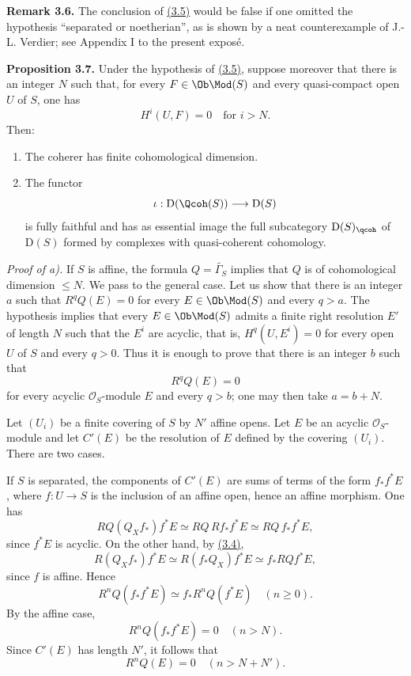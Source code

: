 \textbf{Remark 3.6.} The conclusion of \hyperlink{sga6.e02.prop.3-5}{(3.5)} would be false if one omitted the hypothesis ``separated or noetherian'', as is shown by a neat counterexample of J.-L. Verdier; see Appendix I to the present exposé.

\textbf{Proposition 3.7.} Under the hypothesis of \hyperlink{sga6.e02.prop.3-5}{(3.5)}, suppose moreover that there is an integer $N$ such that, for every $F\in\Ob\Mod(S)$ and every quasi-compact open $U$ of $S$, one has
\[
 H^i(U,F)=0\quad\text{for }i>N.
\]
Then:
\begin{enumerate}[label=\alph*)]
\item The coherer has finite cohomological dimension.
\item The functor
\[
 \iota:\mathrm D(\Qcoh(S))\longrightarrow \mathrm D(S)
\]
is fully faithful and has as essential image the full subcategory $\mathrm D(S)_{\qcoh}$ of $\mathrm D(S)$ formed by complexes with quasi-coherent cohomology.
\end{enumerate}

\emph{Proof of a).} If $S$ is affine, the formula $Q=\widetilde{\Gamma_S}$ implies that $Q$ is of cohomological dimension $\leq N$. We pass to the general case. Let us show that there is an integer $a$ such that $R^qQ(E)=0$ for every $E\in\Ob\Mod(S)$ and every $q>a$. The hypothesis implies that every $E\in\Ob\Mod(S)$ admits a finite right resolution $E'$ of length $N$ such that the $E^i$ are acyclic, that is, $H^q(U,E^i)=0$ for every open $U$ of $S$ and every $q>0$. Thus it is enough to prove that there is an integer $b$ such that
\[
 R^qQ(E)=0
\]
for every acyclic $\mathcal O_S$-module $E$ and every $q>b$; one may then take $a=b+N$.

Let $(U_i)$ be a finite covering of $S$ by $N'$ affine opens. Let $E$ be an acyclic $\mathcal O_S$-module and let $C'(E)$ be the resolution of $E$ defined by the covering $(U_i)$. There are two cases.

If $S$ is separated, the components of $C'(E)$ are sums of terms of the form $f_*f^*E$, where $f:U\to S$ is the inclusion of an affine open, hence an affine morphism. One has
\[
 RQ(Q_Xf_*)f^*E\simeq RQ\,Rf_*f^*E\simeq RQ\,f_*f^*E,
\]
since $f^*E$ is acyclic. On the other hand, by \hyperlink{sga6.e02.lem.3-4}{(3.4)},
\[
 R(Q_Xf_*)f^*E\simeq R(f_*Q_X)f^*E\simeq f_*RQf^*E,
\]
since $f$ is affine. Hence
\[
 R^nQ(f_*f^*E)\simeq f_*R^nQ(f^*E)\quad(n\geq0).
\]
By the affine case,
\[
 R^nQ(f_*f^*E)=0\quad(n>N).
\]
Since $C'(E)$ has length $N'$, it follows that
\[
 R^nQ(E)=0\quad(n>N+N').
\]

